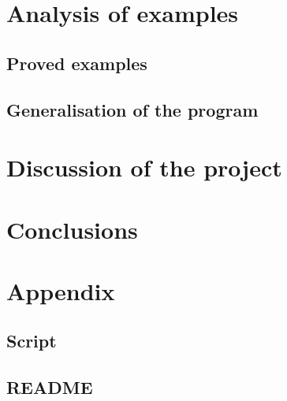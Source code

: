 \documentclass[a4paper,12pt]{report}
\begin{document}
\chapter{Analysis of examples}

\section{Proved examples}

\section{Generalisation of the program}




\chapter{Discussion of the project}


\chapter{Conclusions}



\chapter{Appendix}

\section{Script}

\section{README}
\end{document}
